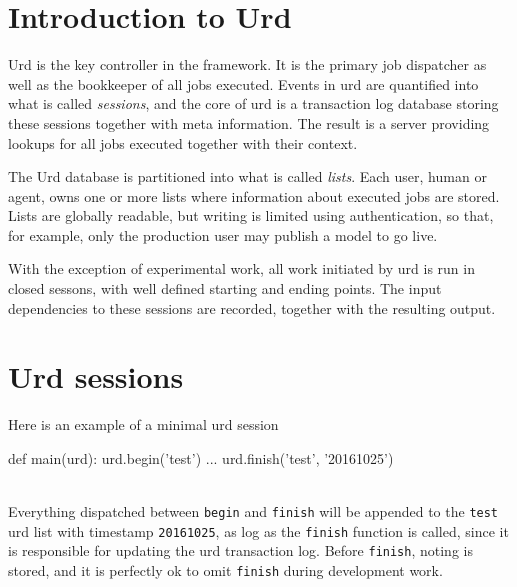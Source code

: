 \section{Introduction to Urd}

Urd is the key controller in the framework.  It is the primary job
dispatcher as well as the bookkeeper of all jobs executed.  Events in
urd are quantified into what is called \textsl{sessions}, and the core
of urd is a transaction log database storing these sessions together
with meta information.  The result is a server providing lookups for
all jobs executed together with their context.

The Urd database is partitioned into what is called \textsl{lists}.
Each user, human or agent, owns one or more lists where information
about executed jobs are stored.  Lists are globally readable, but
writing is limited using authentication, so that, for example, only
the production user may publish a model to go live.

With the exception of experimental work, all work initiated by urd is
run in closed sessons, with well defined starting and ending points.
The input dependencies to these sessions are recorded, together with
the resulting output.



\section{Urd sessions}

Here is an example of a minimal urd session
\\
\begin{python}
def main(urd):
  urd.begin('test')
  ...
  urd.finish('test', '20161025')
\end{python}
\\
Everything dispatched between \texttt{begin} and \texttt{finish} will
be appended to the \texttt{test} urd list with timestamp
\texttt{20161025}, as log as the \texttt{finish} function is called,
since it is responsible for updating the urd transaction log.  Before
\texttt{finish}, noting is stored, and it is perfectly ok to omit
\texttt{finish} during development work.

